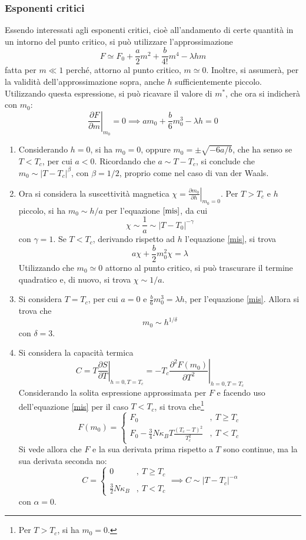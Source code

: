 \documentclass[11pt, a4paper]{scrartcl}
\theoremstyle{style}
\theoremstyle{style1}
\newcommand*\Eval[3]{\left.#1\right\rvert_{#2}^{#3}}
\numberwithin{equation}{subsection}
\begin{document}
\subsubsection{Esponenti critici}

Essendo interessati agli esponenti critici, cio\`e all'andamento di certe quantit\`a in un intorno del punto critico, si pu\`o utilizzare l'approssimazione 
\[
F \simeq F_0 + \frac{a}{2}m^2 + \frac{b}{4!}m^4 - \lambda hm
\] 
fatta per $m\ll 1$ perch\'e, attorno al punto critico, $m\simeq 0$.
Inoltre, si assumer\`a, per la validit\`a dell'approssimazione sopra, anche $h $ sufficientemente piccolo.
Utilizzando questa espressione, si pu\`o ricavare il valore di $m^*$, che ora si indicher\`a con $m_0$:
\begin{equation}\label{mis}
	\Eval{\frac{\partial F}{\partial m} }{m_0}{} = 0 \implies am_0 + \frac{b}{6}m_0^3 - \lambda h = 0
\end{equation}
\begin{enumerate}[(1).]
	\item Considerando $h=0$, si ha $m_0 =0$, oppure $m_0 = \pm \sqrt{-6a / b} $, che ha senso se $T<T_c$, per cui $a < 0$. 
		Ricordando che $a \sim T-T_c$, si conclude che $m_0 \sim \lvert T - T_c \rvert ^{\beta }$, con $\beta = 1/2$, proprio come nel caso di van der Waals.
	\item Ora si considera la suscettivit\`a magnetica $\chi  = \Eval{\frac{\partial m_0}{\partial h} }{m_0=0}{}$.
		Per $T>T_c$ e $h$ piccolo, si ha $m_0 \sim h / a$ per l'equazione $\ref{mis}$, da cui
		\[
		\chi \sim \frac{1}{a} \sim \lvert T-T_0 \rvert ^{-\gamma}
		\] 
		con $\gamma = 1$.
		Se $T<T_c$, derivando rispetto ad $h$ l'equazione \ref{mis}, si trova 
		\[
		a \chi  + \frac{b}{2}m_0^2 \chi  = \lambda 
		\] 
	Utilizzando che $m_0 \simeq 0$ attorno al punto critico, si pu\`o trascurare il termine quadratico e, di nuovo, si trova $\chi \sim 1 / a$.
\item Si considera $T = T_c$, per cui $a = 0$ e $\frac{b}{6}m_0^3 = \lambda h$, per l'equazione \ref{mis}.
	Allora si trova che 
	\[
	m_0 \sim h ^{1 / \delta }
	\] 
	con $\delta = 3$.
\item Si considera la capacit\`a termica 
	\[
		C = T \Eval{\frac{\partial S}{\partial T} }{h=0, T=T_c}{} = - T_c \Eval{\frac{\partial^2 F(m_0)}{\partial T^2} }{h=0, T=T_c}{}
	\] 
	Considerando la solita espressione approssimata per $F$ e facendo uso dell'equazione \ref{mis} per il caso $T<T_c$, si trova che\footnote{Per $T>T_c$, si ha $m_0=0$.}
	\[
	F(m_0) = \begin{cases}
		F_0 &,\ T\ge T_c\\
		F_0 - \frac{3}{4}N\kappa _B T \frac{(T_c-T)^2}{T_c^2} &,\ T<T_c
	\end{cases}
	\] 
	Si vede allora che $F$ e la sua derivata prima rispetto a $T$ sono continue, ma la sua derivata seconda no:
	\[
	C = \begin{cases}
		0 &,\ T\ge T_c\\
		\\
		\displaystyle \frac{3}{2}N\kappa _B &,\ T<T_c
	\end{cases} \implies C \sim \lvert T-T_c \rvert ^{-\alpha }
	\] 
	con $\alpha  = 0$.
\end{enumerate}
\end{document}
